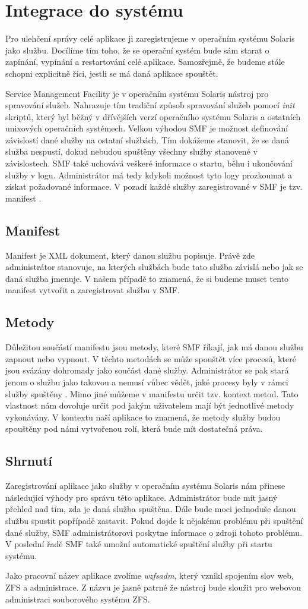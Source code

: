 \section{Integrace do systému}
Pro ulehčení správy celé aplikace ji zaregistrujeme v operačním systému Solaris jako službu. Docílíme tím toho, že se operační systém bude sám starat o zapínání, vypínání a restartování celé aplikace. Samozřejmě, že budeme stále schopni explicitně říci, jestli se má daná aplikace spouštět.

Service Management Facility je v operačním systému Solaris nástroj pro spravování služeb. Nahrazuje tím tradiční způsob spravování služeb pomocí \emph{init} skriptů, který byl běžný v dřívějších verzí operačního systému Solaris a ostatních unixových operačních systémech. Velkou výhodou SMF je možnost definování závislostí dané služby na ostatní službách. Tím dokážeme stanovit, že se daná služba nespustí, dokud nebudou spuštěny všechny služby stanovené v závislostech. SMF také uchovává veškeré informace o startu, běhu i ukončování služby v logu. Administrátor má tedy kdykoli možnost tyto logy prozkoumat a získat požadované informace. V pozadí každé služby zaregistrované v SMF je tzv. manifest \cite{SMF}.
    \subsection{Manifest}
    Manifest je XML dokument, který danou službu popisuje. Právě zde administrátor stanovuje, na kterých službách bude tato služba závislá nebo jak se daná služba jmenuje. V našem případě to znamená, že si budeme muset tento manifest vytvořit a zaregistrovat službu v SMF.
    \subsection{Metody}
    Důležitou součástí manifestu jsou metody, které SMF říkají, jak má danou službu zapnout nebo vypnout. V těchto metodách se může spouštět více procesů, které jsou svázány dohromady jako součást dané služby. Administrátor se pak stará jenom o službu jako takovou a nemusí vůbec vědět, jaké procesy byly v rámci služby spuštěny \cite{SMF}. Mimo jiné můžeme v manifestu určit tzv. kontext metod. Tato vlastnost nám dovoluje určit pod jakým uživatelem mají být jednotlivé metody vykonávány. V kontextu naší aplikace to znamená, že metody služby budou spouštěny pod námi vytvořenou rolí, která bude mít dostatečná práva.
    \subsection{Shrnutí}
    Zaregistrování aplikace jako služby v operačním systému Solaris nám přinese následující výhody pro správu této aplikace. Administrátor bude mít jasný přehled nad tím, zda je daná služba spuštěna. Dále bude moci jednoduše danou službu spustit popřípadě zastavit. Pokud dojde k nějakému problému při spuštění dané služby, SMF administrátorovi poskytne informace o zdroji tohoto problému. V poslední řadě SMF také umožní automatické spuštění služby při startu systému.
     
    Jako pracovní název aplikace zvolíme \emph{wzfsadm}, který vznikl spojením slov web, ZFS a administrace. Z názvu je jasně patrné že nástroj bude sloužit pro webovou administraci souborového systému ZFS.


